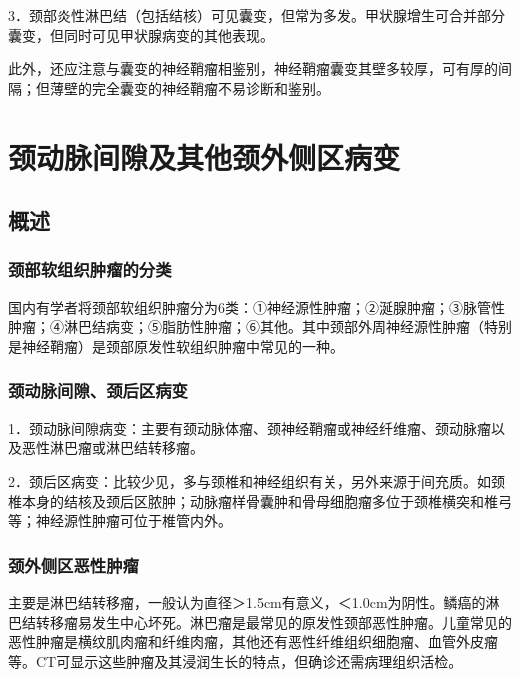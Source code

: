3．颈部炎性淋巴结（包括结核）可见囊变，但常为多发。甲状腺增生可合并部分囊变，但同时可见甲状腺病变的其他表现。

此外，还应注意与囊变的神经鞘瘤相鉴别，神经鞘瘤囊变其壁多较厚，可有厚的间隔；但薄壁的完全囊变的神经鞘瘤不易诊断和鉴别。

\section{颈动脉间隙及其他颈外侧区病变}

\subsection{概述}

\subsubsection{颈部软组织肿瘤的分类}

国内有学者将颈部软组织肿瘤分为6类：①神经源性肿瘤；②涎腺肿瘤；③脉管性肿瘤；④淋巴结病变；⑤脂肪性肿瘤；⑥其他。其中颈部外周神经源性肿瘤（特别是神经鞘瘤）是颈部原发性软组织肿瘤中常见的一种。

\subsubsection{颈动脉间隙、颈后区病变}

1．颈动脉间隙病变：主要有颈动脉体瘤、颈神经鞘瘤或神经纤维瘤、颈动脉瘤以及恶性淋巴瘤或淋巴结转移瘤。

2．颈后区病变：比较少见，多与颈椎和神经组织有关，另外来源于间充质。如颈椎本身的结核及颈后区脓肿；动脉瘤样骨囊肿和骨母细胞瘤多位于颈椎横突和椎弓等；神经源性肿瘤可位于椎管内外。

\subsubsection{颈外侧区恶性肿瘤}

主要是淋巴结转移瘤，一般认为直径＞1.5cm有意义，＜1.0cm为阴性。鳞癌的淋巴结转移瘤易发生中心坏死。淋巴瘤是最常见的原发性颈部恶性肿瘤。儿童常见的恶性肿瘤是横纹肌肉瘤和纤维肉瘤，其他还有恶性纤维组织细胞瘤、血管外皮瘤等。CT可显示这些肿瘤及其浸润生长的特点，但确诊还需病理组织活检。

\subsubsection{}

